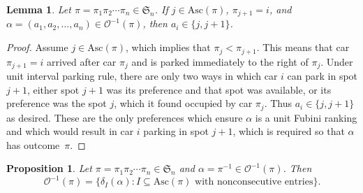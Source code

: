 \documentclass[11pt,reqno]{amsart}
\newcommand*{\Out}{\mathcal{O}}
\newcommand{\Asc}{\mathrm{Asc}}
\newtheorem{proposition}{Proposition}[section]
\newtheorem{lemma}{Lemma}[section]
\theoremstyle{definition}
\theoremstyle{notation}
\theoremstyle{openproblem}
\newcommand{\Sym}{\mathfrak{S}}
\begin{document}
\begin{lemma}
    Let $\pi=\pi_1\pi_2\cdots\pi_n\in\Sym_n$.
    If $j\in\Asc(\pi)$, $\pi_{j+1}=i$, and $\alpha=(a_1,a_2,\ldots,a_n)\in\Out^{-1}(\pi)$, then $a_{i}\in\{j,j+1\}$.
\end{lemma}
\begin{proof}
Assume $j\in\Asc(\pi)$, which implies that $\pi_j<\pi_{j+1}$. 
This means that car $\pi_{j+1}=i$ arrived after car $\pi_j$ and is parked immediately to the right of $\pi_{j}$. Under unit interval parking rule, there are only two ways in which car $i$ can park in spot $j+1$, either spot $j+1$ was its preference and that spot was available, or its preference was the spot $j$, which it found occupied by car $\pi_j$. 
Thus $a_i\in \{j,j+1\}$ as desired.
These are the only preferences which ensure $\alpha$ is a unit Fubini ranking and which would result in car $i$ parking in spot $j+1$, which is required so that $\alpha$ has outcome~$\pi$.
\end{proof}

\begin{proposition}\label{prop:fiberascents}
Let $\pi=\pi_1\pi_2\cdots\pi_n\in\Sym_n$ and $\alpha=\pi^{-1}\in\Out^{-1}(\pi)$. 
    Then \[\Out^{-1}(\pi)=\{\delta_I(\alpha): I\subseteq \Asc(\pi) \mbox{ with nonconsecutive entries}\}.\]
\end{proposition}
\end{document}
